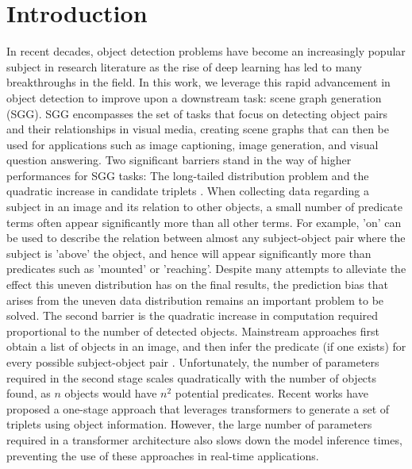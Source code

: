 \documentclass{article}
\begin{document}
\section{Introduction}
In recent decades, object detection problems have become an increasingly popular subject in research literature\cite{zou2023object} as the rise of deep learning\cite{lecun2015deep} has led to many breakthroughs in the field. In this work, we leverage this rapid advancement in object detection to improve upon a downstream task: scene graph generation (SGG)\cite{johnson2015image}. SGG encompasses the set of tasks that focus on detecting object pairs and their relationships in visual media, creating scene graphs that can then be used for applications such as image captioning\cite{gu2019unpaired, gao2018image}, image generation\cite{tripathi2019using}, and visual question answering\cite{zhang2019empirical}. 
Two significant barriers stand in the way of higher performances for SGG tasks: The long-tailed distribution problem \cite{li2024scene, cong2023reltr} and the quadratic increase in candidate triplets \cite{li2024scene, cong2023reltr, yang2018graph}. When collecting data regarding a subject in an image and its relation to other objects, a small number of predicate terms often appear significantly more than all other terms. For example, 'on' can be used to describe the relation between almost any subject-object pair where the subject is 'above' the object, and hence will appear significantly more than predicates such as 'mounted' or 'reaching'. Despite many attempts to alleviate the effect this uneven distribution has on the final results\cite{lee2018multi,dornadula2019visual,liang2017deep, gu2019scene}, the prediction bias that arises from the uneven data distribution remains an important problem to be solved.
The second barrier is the quadratic increase in computation required proportional to the number of detected objects. Mainstream approaches first obtain a list of objects in an image, and then infer the predicate (if one exists) for every possible subject-object pair \cite{yang2018graph, johnson2015image}. Unfortunately, the number of parameters required in the second stage scales quadratically with the number of objects found, as $n$ objects would have $n^2$ potential predicates.
Recent works have proposed a one-stage approach that leverages transformers to generate a set of triplets using object information\cite{cong2023reltr,li2022sgtr}. However, the large number of parameters required in a transformer architecture also slows down the model inference times, preventing the use of these approaches in real-time applications.
\end{document}
